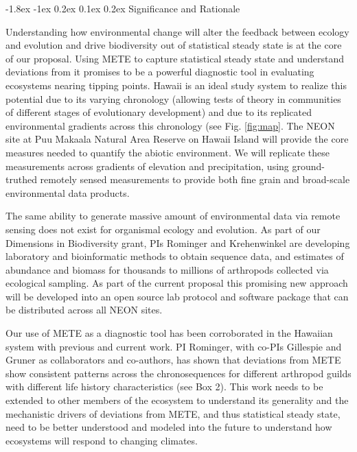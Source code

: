 \documentclass[11pt]{article}
\makeatletter
\renewcommand\subsection{\@startsection{subsection}{1}{\z@}%
                                  {-1.8ex \@plus -1ex \@minus 0.2ex}%
                                  {0.1ex \@plus 0.2ex}%
                                  {\normalfont\large\bfseries}}
\makeatother
\begin{document}
\subsection{Significance and Rationale}


Understanding how environmental change will alter the feedback between
ecology and evolution and drive biodiversity out of statistical steady
state is at the core of our proposal.  Using METE to capture
statistical steady state and understand deviations from it promises to
be a powerful diagnostic tool in evaluating ecosystems nearing tipping
points.  Hawaii is an ideal study system to realize this potential due
to its varying chronology (allowing tests of theory in communities of
different stages of evolutionary development) and due to its
replicated environmental gradients across this chronology (see
Fig. \ref{fig:map}. The NEON site at Puu Makaala Natural Area Reserve
on Hawaii Island will provide the core measures needed to quantify the
abiotic environment.  We will replicate these measurements across
gradients of elevation and precipitation, using ground-truthed
remotely sensed measurements to provide both fine grain and
broad-scale environmental data products.

The same ability to generate massive amount of environmental data via
remote sensing does not exist for organismal ecology and evolution.
As part of our Dimensions in Biodiversity grant, PIs Rominger and
Krehenwinkel are developing laboratory and bioinformatic methods to
obtain sequence data, and estimates of abundance and biomass for
thousands to millions of arthropods collected via ecological sampling.
As part of the current proposal this promising new approach will be
developed into an open source lab protocol and software package that
can be distributed across all NEON sites.

Our use of METE as a diagnostic tool has been corroborated in the
Hawaiian system with previous and current work.  PI Rominger, with
co-PIs Gillespie and Gruner as collaborators and co-authors, has shown
that deviations from METE show consistent patterns across the
chronosequences for different arthropod guilds with different life
history characteristics (see Box 2).  This work needs to be extended
to other members of the ecosystem to understand its generality and the
mechanistic drivers of deviations from METE, and thus statistical
steady state, need to be better understood and modeled into the future
to understand how ecosystems will respond to changing climates.
\end{document}
